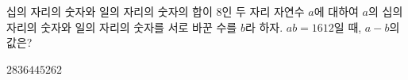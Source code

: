 십의 자리의 숫자와 일의 자리의 숫자의 합이 $8$인 두 자리 자연수 $a$에 대하여 $a$의 십의 자리의 숫자와 일의 자리의 숫자를 서로 바꾼 수를 $b$라 하자. $ab=1612$일 때, $a-b$의 값은? 
\begin{choices32}{$28$}{$36$}{$44$}{$52$}{$62$}\end{choices32}
